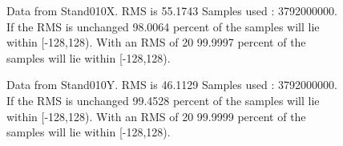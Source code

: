 \begin{figure}[ht] 				 				 				\caption{Data from Stand010X. RMS is 55.1743 Samples used : 3792000000. If the RMS is unchanged 98.0064 percent of the samples will lie within [-128,128).  				 With an RMS of 20 99.9997 percent of the samples will lie within [-128,128).} 				\end{figure} 

\begin{figure}[ht] 				 				 				\caption{Data from Stand010Y. RMS is 46.1129 Samples used : 3792000000. If the RMS is unchanged 99.4528 percent of the samples will lie within [-128,128).  				 With an RMS of 20 99.9999 percent of the samples will lie within [-128,128).} 				\end{figure} 

